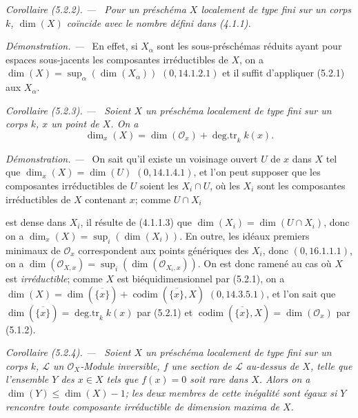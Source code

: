 \documentclass[10pt,oneside]{book}
\makeatletter
\newcommand{\oldpage}[2][]{%
  \setcounter{footnote}{0}%
  \marginpar{\scriptsize\textbf{#1}~|~#2}\ignorespaces}
\newenvironment{corollary}[1][]{%
  \par\medskip\noindent\itshape Corollaire (#1). ---\ }{\par}
\newenvironment{proof}{%
  \par\medskip\noindent\textit{Démonstration. ---\ }}{\par}
\newcommand{\EGAReaderTarget}[2]{\hypertarget{#1}{}\@bsphack\begingroup\def\@currentHref{#1}\label{#2}\endgroup\@esphack}
\makeatother
\begin{document}
\begin{corollary}[5.2.2]
\label{IV.2.5.2.2-fr}
Pour un préschéma $X$ localement de type fini sur un corps $k$, $\dim(X)$
coïncide avec le nombre défini dans (4.1.1).
\end{corollary}

\begin{proof}
En effet, si $X_\alpha$ sont les sous-préschémas réduits ayant pour espaces
sous-jacents les composantes irréductibles de $X$, on a
$\dim(X)=\sup_\alpha(\dim(X_\alpha))$ $(0,14.1.2.1)$ et il suffit d'appliquer
(5.2.1) aux $X_\alpha$.
\end{proof}

\begin{corollary}[5.2.3]
\EGAReaderTarget{ega4.c04.cor.5-2-3}{IV.2.5.2.3-fr}
Soient $X$ un préschéma localement de type fini sur un corps $k$, $x$ un
point de $X$. On a
\begin{equation}
\dim_x(X)=\dim(\mathcal O_x)+\operatorname{deg.tr}_k k(x).
\tag{5.2.3.1}\label{IV.2.5.2.3.1-fr}
\end{equation}
\end{corollary}

\begin{proof}
On sait qu'il existe un voisinage ouvert $U$ de $x$ dans $X$ tel que
$\dim_x(X)=\dim(U)$ $(0,14.1.4.1)$, et l'on peut supposer que les composantes
irréductibles de $U$ soient les $X_i\cap U$, où les $X_i$ sont les
composantes irréductibles de $X$ contenant $x$; comme $U\cap X_i$

\oldpage[IV-2]{91}

est dense dans $X_i$, il résulte de (4.1.1.3) que
$\dim(X_i)=\dim(U\cap X_i)$, donc on a
$\dim_x(X)=\sup_i(\dim(X_i))$. En outre, les idéaux premiers minimaux de
$\mathcal O_x$ correspondent aux points génériques des $X_i$, donc
$(0,16.1.1.1)$, on a
$\dim(\mathcal O_{X,x})=\sup_i(\dim(\mathcal O_{X_i,x}))$. On est donc ramené
au cas où $X$ est \emph{irréductible}; comme $X$ est biéquidimensionnel par
(5.2.1), on a
$\dim(X)=\dim(\overline{\{x\}})+\operatorname{codim}(\overline{\{x\}},X)$
$(0,14.3.5.1)$, et l'on sait que
$\dim(\overline{\{x\}})=\operatorname{deg.tr}_k k(x)$ par (5.2.1) et
$\operatorname{codim}(\overline{\{x\}},X)=\dim(\mathcal O_x)$ par (5.1.2).
\end{proof}

\begin{corollary}[5.2.4]
\label{IV.2.5.2.4-fr}
Soient $X$ un préschéma localement de type fini sur un corps $k$, $\mathcal L$
un $\mathcal O_X$-Module inversible, $f$ une section de $\mathcal L$ au-dessus
de $X$, telle que l'ensemble $Y$ des $x\in X$ tels que $f(x)=0$ soit rare
dans $X$. Alors on a $\dim(Y)\leq\dim(X)-1$; les deux membres de cette
inégalité sont égaux si $Y$ rencontre toute composante irréductible de
dimension maxima de $X$.
\end{corollary}
\end{document}
